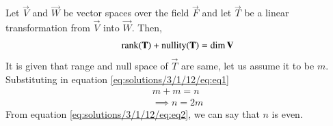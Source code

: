 Let $\vec{V}$ and $\vec{W}$ be vector spaces over the field $\vec{F}$ and let $\vec{T}$ be a linear transformation from $\vec{V}$ into $\vec{W}$. Then,
\begin{align}
    \operatorname*{rank} (\mathbf{T}) + \operatorname*{nullity} (\mathbf{T}) = \dim \mathbf{V} \label{eq:solutions/3/1/12/eq:eq1}
\end{align}
It is given that range and null space of $\vec{T}$ are same, let us assume it to be $m$.
Substituting in equation \eqref{eq:solutions/3/1/12/eq:eq1}
\begin{align}
    m + m = n\\
\implies n = 2m \label{eq:solutions/3/1/12/eq:eq2}
\end{align}
From equation \eqref{eq:solutions/3/1/12/eq:eq2}, we can say that $n$ is even.\\

